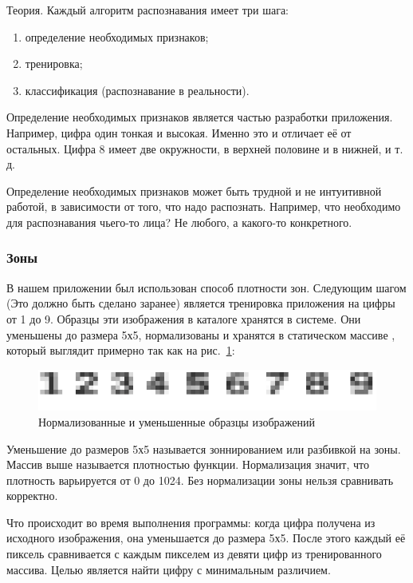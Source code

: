 Теория. Каждый алгоритм распознавания имеет три шага:
\begin{enumerate}
  \item определение необходимых признаков;
  \item тренировка;
  \item классификация (распознавание в реальности).
\end{enumerate}

Определение необходимых признаков является частью разработки приложения. Например, цифра один тонкая и высокая. Именно это и отличает её от остальных. Цифра 8 имеет две окружности, в верхней половине и в нижней, и т. д. 

Определение необходимых признаков может быть трудной и не интуитивной работой, в зависимости от того, что надо распознать. Например, что необходимо для распознавания чьего-то лица? Не любого, а какого-то конкретного.

\subsubsection{Зоны}
В нашем приложении был использован способ плотности зон. Следующим шагом (Это должно быть сделано заранее) является тренировка приложения на цифры от 1 до 9. Образцы эти изображения в каталоге хранятся в системе. Они уменьшены до размера 5х5, нормализованы и хранятся в статическом массиве , который выглядит примерно так как на рис.~\ref{fig:fig210}:

\begin{figure}[ht!]
  \centering
  \includegraphics[width=\textwidth]{inc/raster/design2-10.png}
  \caption{Нормализованные и уменьшенные образцы изображений}
  \label{fig:fig210}
\end{figure}

Уменьшение до размеров 5х5 называется зоннированием или разбивкой на зоны. Массив выше называется плотностью функции.
Нормализация значит, что плотность варьируется от 0 до 1024. Без нормализации зоны нельзя сравнивать корректно.

Что происходит во время выполнения программы: когда цифра получена из исходного изображения, она уменьшается до размера 5х5. После этого каждый её пиксель сравнивается с каждым пикселем из девяти цифр из тренированного массива. Целью является найти цифру с минимальным различием. 

